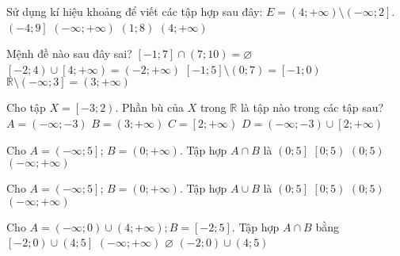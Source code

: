 \begin{ex}%
	Sử dụng kí hiệu khoảng để viết các tập hợp sau đây: $E=\left(4;+\infty\right)\setminus\left(-\infty ;2\right]$.
	\choice
	{$\left(-4;9\right]$}
	{$\left(-\infty ;+\infty\right)$}
	{$\left(1;8\right)$}
	{\True $\left(4;+\infty\right)$}
	\loigiai{
		Ta có $E=\left(4;+\infty\right)\setminus\left(-\infty ;2\right]=\left(4;+\infty\right)$.
	}
\end{ex}

\begin{ex}%
	Mệnh đề nào sau đây sai?
	\choice
	{$\left[-1;7\right]\cap\left(7;10\right)=\varnothing $}
	{$\left[-2;4\right)\cup\left[4;+\infty\right)=\left(-2;+\infty\right)$}
	{\True $\left[-1;5\right]\setminus\left(0;7\right)=\left[-1;0\right)$}
	{$\mathbb{R}\setminus \left(-\infty ;3\right]=\left(3;+\infty\right)$}
\end{ex}

\begin{ex}%
	Cho tập $X=\left[-3;2\right)$. Phần bù của $X$ trong $\mathbb{R}$ là tập nào trong các tập sau?
	\choice
	{$A=\left(-\infty ;-3\right)$}
	{$B=\left(3;+\infty\right)$}
	{$C=\left[2;+\infty\right)$}
	{\True $D=\left(-\infty ;-3\right)\cup\left[2;+\infty\right)$}
	\loigiai{
		Ta có $C_{\mathbb{R}}A=\mathbb{R}\setminus A=\left(-\infty ;-3\right)\cup \left[2;+\infty\right)$.
	}
\end{ex}

\begin{ex}%
	Cho $A=\left(-\infty ;5\right]$; $B=\left(0;+\infty\right)$. Tập hợp $A\cap B$ là
	\choice
	{\True $\left(0;5\right]$}
	{$\left[0;5\right)$}
	{$\left(0;5\right)$}
	{$\left(-\infty ;+\infty\right)$}
	\loigiai{
		Ta có $A\cap B=\left(0;5\right]$.
	}
\end{ex}

\begin{ex}%
	Cho $A=\left(-\infty ;5\right]$; $B=\left(0;+\infty\right)$. Tập hợp $A\cup B$ là
	\choice
	{$\left(0;5\right]$}
	{$\left[0;5\right)$}
	{$\left(0;5\right)$}
	{\True $\left(-\infty ;+\infty\right)$}
\end{ex}

\begin{ex}%
	Cho $A=\left(-\infty ;0\right)\cup\left(4;+\infty\right);
	B=\left[-2;5\right]$. Tập hợp $A\cap B$ bằng
	\choice
	{\True $\left[-2;0\right)\cup\left(4;5\right]$}
	{$\left(-\infty ;+\infty\right)$}
	{$\varnothing $}
	{$\left(-2;0\right)\cup\left(4;5\right)$}
\end{ex}

